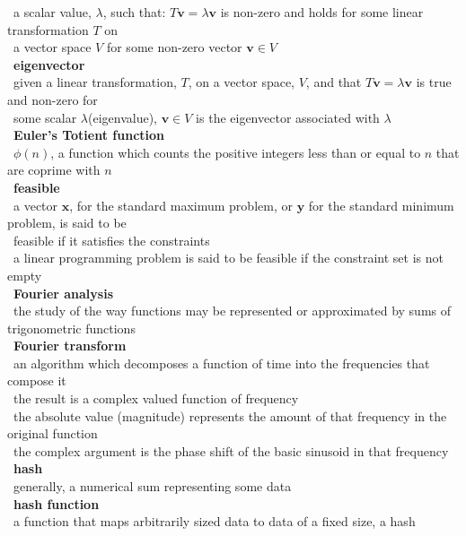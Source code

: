 \documentclass[10pt,letterpaper]{scrartcl}
\newcommand{\tbul}{\textbullet}
\newcommand{\tend}{\>\textendash}
\newcommand{\tasc}{\>\>\textasteriskcentered}
\begin{document}
\begin{tabbing}
\begin{tabbing}
    \tend\ a scalar value, $\lambda$, such that: $T\mathbf{v}=\lambda\mathbf{v}$ is non-zero and holds for some linear transformation $T$ on \\ \>\ a vector space $V$ for some non-zero vector $\mathbf{v} \in V$\\
\tbul\ \textbf{eigenvector} \\
    \tend\ given a linear transformation, $T$, on a vector space, $V$, and that $T\mathbf{v}=\lambda\mathbf{v}$ is true and non-zero for \\ \>\ some scalar $\lambda$(eigenvalue), $\mathbf{v} \in V$ is the eigenvector associated with $\lambda$ \\
\tbul\ \textbf{Euler's Totient function} \\
    \tend\ $\phi (n)$, a function which counts the positive integers less than or equal to $n$ that are coprime with $n$\\
\tbul\ \textbf{feasible} \\
    \tend\ a vector $\mathbf{x}$, for the standard maximum problem, or $\mathbf{y}$ for the standard minimum problem, is said to be \\ \>\ feasible if it satisfies the constraints \\
    \tend\ a linear programming problem is said to be feasible if the constraint set is not empty \\
\tbul\ \textbf{Fourier analysis} \\
    \tend\ the study of the way functions may be represented or approximated by sums of trigonometric functions \\
\tbul\ \textbf{Fourier transform} \\
    \tend\ an algorithm which decomposes a function of time into the frequencies that compose it \\
    \tend\ the result is a complex valued function of frequency \\
        \tasc\ the absolute value (magnitude) represents the amount of that frequency in the original function \\
        \tasc\ the complex argument is the phase shift of the basic sinusoid in that frequency \\
\tbul\ \textbf{hash} \\
    \tend\ generally, a numerical sum representing some data \\
\tbul\ \textbf{hash function} \\
    \tend\ a function that maps arbitrarily sized data to data of a fixed size, a hash \\

\end{tabbing}
\end{tabbing}
\end{document}
